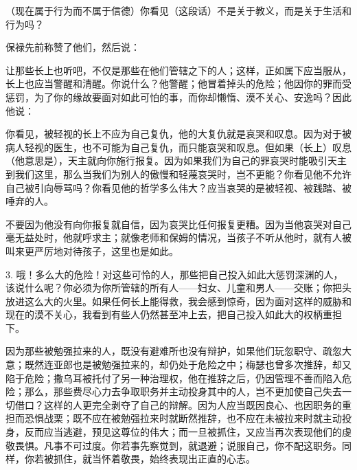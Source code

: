 （现在属于行为而不属于信德）你看见（这段话）不是关于教义，而是关于生活和行为吗？\par

保禄先前称赞了他们，然后说：\par

让那些长上也听吧，不仅是那些在他们管辖之下的人；这样，正如属下应当服从，长上也应当警醒和清醒。你说什么？他警醒；他冒着掉头的危险；他因你的罪而受惩罚，为了你的缘故要面对如此可怕的事，而你却懒惰、漠不关心、安逸吗？因此他说：\par

你看见，被轻视的长上不应为自己复仇，他的大复仇就是哀哭和叹息。因为对于被病人轻视的医生，也不可能为自己复仇，而只能哀哭和叹息。但如果（长上）叹息（他意思是），天主就向你施行报复。因为如果我们为自己的罪哀哭时能吸引天主到我们这里，那么当我们为别人的傲慢和轻蔑哀哭时，岂不更能？你看见他不允许自己被引向辱骂吗？你看见他的哲学多么伟大？应当哀哭的是被轻视、被践踏、被唾弃的人。\par

不要因为他没有向你报复就自信，因为哀哭比任何报复更糟。因为当他哀哭对自己毫无益处时，他就呼求主；就像老师和保姆的情况，当孩子不听从他时，就有人被叫来更严厉地对待孩子，这里也是如此。\par

3. 哦！多么大的危险！对这些可怜的人，那些把自己投入如此大惩罚深渊的人，该说什么呢？你必须为你所管辖的所有人——妇女、儿童和男人——交账；你把头放进这么大的火里。如果任何长上能得救，我会感到惊奇，因为面对这样的威胁和现在的漠不关心，我看到有些人仍然甚至冲上去，把自己投入如此大的权柄重担下。\par

因为那些被勉强拉来的人，既没有避难所也没有辩护，如果他们玩忽职守、疏忽大意；既然连亚郎也是被勉强拉来的，却仍处于危险之中；梅瑟也曾多次推辞，却又陷于危险；撒乌耳被托付了另一种治理权，他在推辞之后，仍因管理不善而陷入危险；那么，那些费尽心力去争取职务并主动投身其中的人，岂不更加使自己失去一切借口？这样的人更完全剥夺了自己的辩解。因为人应当既因良心、也因职务的重担而恐惧战栗；既不应在被勉强拉来时就断然推辞，也不应在未被拉来时就主动投身，反而应当逃避，预见这尊位的伟大；而一旦被抓住，又应当再次表现他们的虔敬畏惧。凡事不可过度。你若事先察觉到，就退避；说服自己，你不配这职务。同样，你若被抓住，就当怀着敬畏，始终表现出正直的心志。\par

